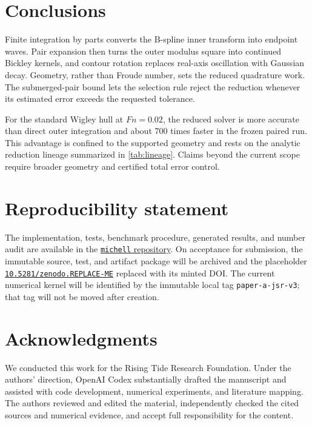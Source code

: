 \documentclass[10pt]{article}
\newcommand{\Fn}{\mathit{Fn}}
\newcommand{\ArchiveDOI}{10.5281/zenodo.REPLACE-ME}
\begin{document}
\section{Conclusions}

Finite integration by parts converts the B-spline inner transform into endpoint
waves.  Pair expansion then turns the outer modulus square into continued
Bickley kernels, and contour rotation replaces real-axis oscillation with
Gaussian decay.  Geometry, rather than Froude number, sets the reduced
quadrature work.  The submerged-pair bound lets the selection rule reject the
reduction whenever its estimated error exceeds the requested tolerance.

For the standard Wigley hull at \(\Fn=0.02\), the reduced solver is more
accurate than direct outer integration and about 700 times faster in the
frozen paired run.  This advantage is confined to the supported geometry and
rests on the analytic reduction lineage summarized in \cref{tab:lineage}.
Claims beyond the current scope require broader geometry and certified total
error control.

\section*{Reproducibility statement}

The implementation, tests, benchmark procedure, generated results, and number
audit are available in the
\href{https://github.com/risingtideresearch/michell}{\texttt{michell}
repository}.  On acceptance for submission, the immutable source, test, and
artifact package will be archived and the placeholder
\href{https://doi.org/\ArchiveDOI}{\nolinkurl{\ArchiveDOI}} replaced with its
minted DOI.  The current numerical kernel will be identified by the immutable
local tag \texttt{paper-a-jsr-v3}; that tag will not be moved after creation.

\section*{Acknowledgments}

We conducted this work for the Rising Tide Research Foundation.  Under the
authors' direction, OpenAI Codex substantially drafted the manuscript and
assisted with code development, numerical experiments, and literature mapping.
The authors reviewed and edited the material, independently checked the cited
sources and numerical evidence, and accept full responsibility for the
content.



\end{document}
